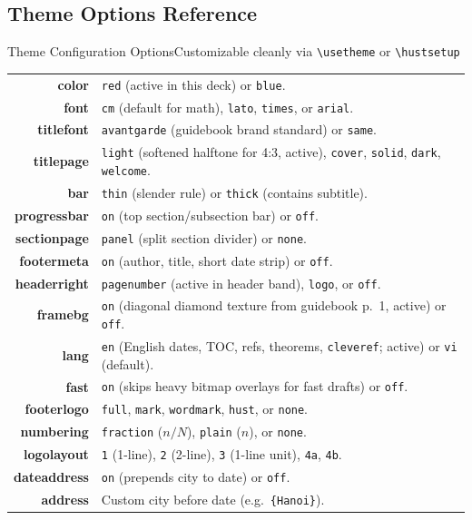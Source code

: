 \documentclass[aspectratio=43,10pt]{beamer}
\begin{document}
\subsection{Theme Options Reference}
\begin{frame}{Theme Configuration Options}{Customizable cleanly via \texttt{\textbackslash usetheme} or \texttt{\textbackslash hustsetup}}
  \scriptsize
  \centering
  \begin{tabularx}{\textwidth}{>{\ttfamily\bfseries\color{hustmain}}r >{\small\raggedright\arraybackslash}X}
    color       & \texttt{red} (active in this deck) or \texttt{blue}. \\
    font        & \texttt{cm} (default for math), \texttt{lato}, \texttt{times}, or \texttt{arial}. \\
    titlefont   & \texttt{avantgarde} (guidebook brand standard) or \texttt{same}. \\
    titlepage   & \texttt{light} (softened halftone for 4:3, active), \texttt{cover}, \texttt{solid}, \texttt{dark}, \texttt{welcome}. \\
    bar         & \texttt{thin} (slender rule) or \texttt{thick} (contains subtitle). \\
    progressbar & \texttt{on} (top section/subsection bar) or \texttt{off}. \\
    sectionpage & \texttt{panel} (split section divider) or \texttt{none}. \\
    footermeta  & \texttt{on} (author, title, short date strip) or \texttt{off}. \\
    headerright & \texttt{pagenumber} (active in header band), \texttt{logo}, or \texttt{off}. \\
    framebg     & \texttt{on} (diagonal diamond texture from guidebook p.~1, active) or \texttt{off}. \\
    lang        & \texttt{en} (English dates, TOC, refs, theorems, \texttt{cleveref}; active) or \texttt{vi} (default). \\
    fast        & \texttt{on} (skips heavy bitmap overlays for fast drafts) or \texttt{off}. \\
    footerlogo  & \texttt{full}, \texttt{mark}, \texttt{wordmark}, \texttt{hust}, or \texttt{none}. \\
    numbering   & \texttt{fraction} ($n/N$), \texttt{plain} ($n$), or \texttt{none}. \\
    logolayout  & \texttt{1} (1-line), \texttt{2} (2-line), \texttt{3} (1-line unit), \texttt{4a}, \texttt{4b}. \\
    dateaddress & \texttt{on} (prepends city to date) or \texttt{off}. \\
    address     & Custom city before date (e.g.\ \texttt{\{Hanoi\}}). \\
  \end{tabularx}
\end{frame}
\end{document}
